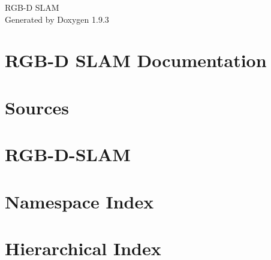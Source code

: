 \documentclass[twoside]{book}
\newcommand{\+}{\discretionary{\mbox{\scriptsize$\hookleftarrow$}}{}{}}
\newcommand{\clearemptydoublepage}{%
    \newpage{\pagestyle{empty}\cleardoublepage}%
  }
\begin{document}
  \raggedbottom
    \hypersetup{pageanchor=false,
                bookmarksnumbered=true,
                pdfencoding=unicode
               }
  \begin{titlepage}
  \vspace*{7cm}
  \begin{center}%
  {\Large RGB-\/\+D SLAM}\\
  \vspace*{1cm}
  {\large Generated by Doxygen 1.9.3}\\
  \end{center}
  \end{titlepage}
  \clearemptydoublepage
  \tableofcontents
  \clearemptydoublepage
  \hypersetup{pageanchor=true}
\chapter{RGB-\/D SLAM Documentation}
\label{index}\hypertarget{index}{}
\chapter{Sources}
\label{md__home_baptisteh__documents_code_robots__r_g_b__s_l_a_m__r_g_b__d__s_l_a_m_src__r_e_a_d_m_e}

\chapter{RGB-\/\+D-\/\+SLAM}
\label{md__home_baptisteh__documents_code_robots__r_g_b__s_l_a_m__r_g_b__d__s_l_a_m__r_e_a_d_m_e}

\chapter{Namespace Index}

\chapter{Hierarchical Index}

\end{document}
